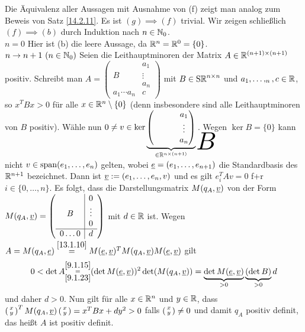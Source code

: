 \documentclass[../../main.tex]{subfiles}
\begin{document}
\begin{cproof}
Die Äquivalenz aller Aussagen mit Ausnahme von (f) zeigt man analog zum Beweis von Satz \ref{14.2.11}. Es ist $(g)\implies (f)$ trivial. Wir zeigen schließlich $(f)\implies (b)$ durch Induktion nach $n\in\mathbb N_0$.\\

\noindent\underline{$n=0$} Hier ist (b) die leere Aussage, da $\mathbb R^n=\mathbb R^0=\{0\}$.\\
\noindent\underline{$n\to n+1\ (n\in\mathbb N_0)$} 
    Seien die Leithauptminoren der Matrix $A\in\mathbb R^{(n+1)\times(n+1)}$ positiv. Schreibt man $A=\left(
        \begin{array}{c|c}
            & a_1\\
            B & \vdots\\
            & a_n\\
            \hline 
            a_1\cdots  a_n & c
        \end{array}
    \right)$ mit $B\in \operatorname{S\mathbb R}^{n\times n}$ und $a_1,\ldots ,_n,c\in \mathbb R$, so $x^TBx>0$ für alle $x\in\mathbb R^{n}\setminus\{0\}$ (denn insbesondere sind alle Leithauptminoren von $B$ positiv). Wähle nun $0\neq v\in\ker\underbrace{\begin{pmatrix}
        \tikz\node[inner sep=0pt] (a) { };&&&a_1
        \\&&&\vdots
        \\&&&a_n
    \end{pmatrix}}_{\in \R^{n\times(n+1)}}
    \begin{tikzpicture}[overlay]
        \node at (a.north) [anchor=center,yshift=-0.5cm, xshift=0.4cm, scale=3] {$B$};
    \end{tikzpicture}$. Wegen $\ker B=\{0\}$ kann nicht $v\in\operatorname{span}(e_1,\ldots ,e_n)$ gelten, wobei ${\underline e}=(e_1,\ldots ,e_{n+1})$ die Standardbasis des $\mathbb R^{n+1}$ bezeichnet. Dann ist ${\underline v}:=(e_1,\ldots ,e_n,v)$ und es gilt $e_i^TAv=0$ f+r $i\in\{0,\ldots ,n\}$. Es folgt, dass die Darstellungsmatrix $M(q_A,{\underline v})$ von der Form $M(q_A,{\underline v})=\left(
        \begin{array}{c|c}
            & 0\\
            B & \vdots\\
            & 0
            \\
            \hline 
            0\ldots  
            0 & d
        \end{array}\right)$ mit $d\in\mathbb R$ ist. Wegen $A=M(q_A,{\underline e})\stackrel{\ref{13.1.10}}{=}M({\underline e},{\underline v})^TM(q_A,{\underline v})M({\underline e},{\underline v})$ gilt
    \begin{align*}
        0<\det A\substack{\ref{9.1.15}\\=\\\ref{9.1.23}}(\det M({\underline e},{\underline v}))^2\det(M(q_A,{\underline v}))=\underbrace{\det M({\underline e},{\underline v})}_{>0}\underbrace{(\det B)}_{>0}d
    \end{align*}
    und daher $d>0$. Nun gilt für alle $x\in \mathbb R^n$ und $y\in \mathbb R$, dass $\left(\begin{smallmatrix}x\\y\end{smallmatrix}\right)^TM(q_A,{\underline v})\left(\begin{smallmatrix}x\\y\end{smallmatrix}\right)=x^TBx+dy^2>0$ falls $\left(\begin{smallmatrix}x\\y\end{smallmatrix}\right)\neq 0$ und damit $q_A$ positiv definit, das heißt $A$ ist positiv definit.
\end{cproof}
\end{document}
